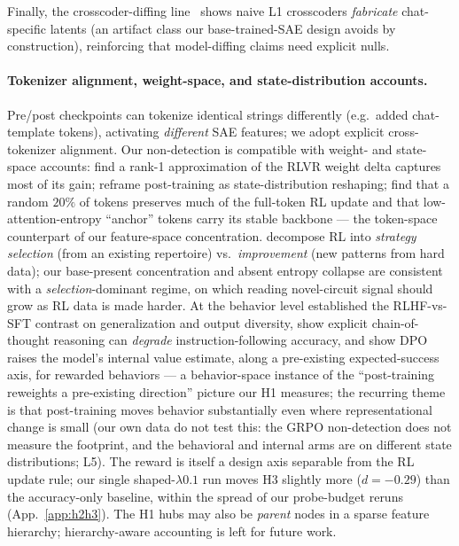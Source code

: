 \documentclass{article}
\begin{document}
Finally, the crosscoder-diffing line~\citep{minder2025crosscoders} shows naive L1 crosscoders \emph{fabricate} chat-specific latents (an artifact class our base-trained-SAE design avoids by construction), reinforcing that model-diffing claims need explicit nulls.

\paragraph{Tokenizer alignment, weight-space, and state-distribution accounts.}
Pre/post checkpoints can tokenize identical strings differently (e.g.\ added chat-template tokens), activating \emph{different} SAE features; we adopt explicit cross-tokenizer alignment. Our non-detection is compatible with weight- and state-space accounts: \citet{relex_rank1_rlvr2026} find a rank-1 approximation of the RLVR weight delta captures most of its gain; \citet{posttraining_states_not_tokens2026} reframe post-training as state-distribution reshaping; \citet{not_all_tokens_alike2026} find that a random $20\%$ of tokens preserves much of the full-token RL update and that low-attention-entropy ``anchor'' tokens carry its stable backbone --- the token-space counterpart of our feature-space concentration. \citet{select_improve2026} decompose RL into \emph{strategy selection} (from an existing repertoire) vs.\ \emph{improvement} (new patterns from hard data); our base-present concentration and absent entropy collapse are consistent with a \emph{selection}-dominant regime, on which reading novel-circuit signal should grow as RL data is made harder. At the behavior level \citet{kirk2024diversity} established the RLHF-vs-SFT contrast on generalization and output diversity, \citet{li2025thinking} show explicit chain-of-thought reasoning can \emph{degrade} instruction-following accuracy, and \citet{valueaxis2026} show DPO raises the model's internal value estimate, along a pre-existing expected-success axis, for rewarded behaviors --- a behavior-space instance of the ``post-training reweights a pre-existing direction'' picture our H1 measures; the recurring theme is that post-training moves behavior substantially even where representational change is small (our own data do not test this: the GRPO non-detection does not measure the footprint, and the behavioral and internal arms are on different state distributions; L5). The reward is itself a design axis separable from the RL update rule; our single shaped-$\lambda0.1$ run moves H3 slightly more ($d=-0.29$) than the accuracy-only baseline, within the spread of our probe-budget reruns (App.~\ref{app:h2h3}). The H1 hubs may also be \emph{parent} nodes in a sparse feature hierarchy; hierarchy-aware accounting is left for future work.
\end{document}
